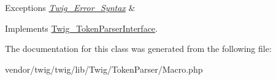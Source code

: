 \begin{DoxyExceptions}{Exceptions}
{\em \hyperlink{classTwig__Error__Syntax}{Twig\+\_\+\+Error\+\_\+\+Syntax}} & \\
\hline
\end{DoxyExceptions}


Implements \hyperlink{interfaceTwig__TokenParserInterface_a9d003ebcca4a13c6f36b86e79815e823}{Twig\+\_\+\+Token\+Parser\+Interface}.



The documentation for this class was generated from the following file\+:\begin{DoxyCompactItemize}
\item 
vendor/twig/twig/lib/\+Twig/\+Token\+Parser/Macro.\+php\end{DoxyCompactItemize}
